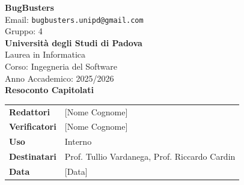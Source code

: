 \documentclass[a4paper,12pt]{article}
\begin{document}
\begin{center}
  
  {\Large\bfseries\color{primaryblue} BugBusters}\\[0.3cm]
  {\small\color{darkgray} Email: \texttt{bugbusters.unipd@gmail.com}} \\[0.1cm]
  {\small\color{darkgray} Gruppo: 4} \\[0.5cm]

  {\large\bfseries Università degli Studi di Padova}\\[0.3cm]
  {\small Laurea in Informatica}\\[0.2cm]
  {\small Corso: Ingegneria del Software}\\[0.2cm]
  {\small Anno Accademico: 2025/2026}\\[0.8cm]

  {\Huge\bfseries\color{primaryblue} Resoconto Capitolati}\\[0.8cm]
\end{center}

\begin{center}
\begin{tcolorbox}[colback=lightgray,colframe=primaryblue,width=0.85\textwidth,arc=3mm,boxrule=0.5pt]
\begin{tabular}{@{}ll@{}}
\textbf{Redattori}    & [Nome Cognome] \\
\textbf{Verificatori} & [Nome Cognome] \\
\textbf{Uso}          & Interno \\
\textbf{Destinatari}  & Prof. Tullio Vardanega, Prof. Riccardo Cardin \\
\textbf{Data}         & [Data] \\
\end{tabular}
\end{tcolorbox}
\end{center}
\end{document}

